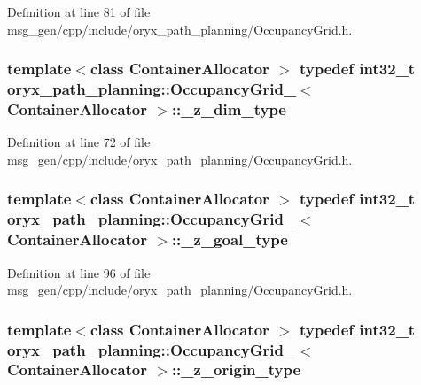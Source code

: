 \-Definition at line 81 of file msg\-\_\-gen/cpp/include/oryx\-\_\-path\-\_\-planning/\-Occupancy\-Grid.\-h.

\subsubsection[{\-\_\-z\-\_\-dim\-\_\-type}]{\setlength{\rightskip}{0pt plus 5cm}template$<$class Container\-Allocator $>$ typedef int32\-\_\-t {\bf oryx\-\_\-path\-\_\-planning\-::\-Occupancy\-Grid\-\_\-}$<$ \-Container\-Allocator $>$\-::{\bf \-\_\-z\-\_\-dim\-\_\-type}}\label{structoryx__path__planning_1_1OccupancyGrid___a92236f6c892e983f1aad904d75ca487d}


\-Definition at line 72 of file msg\-\_\-gen/cpp/include/oryx\-\_\-path\-\_\-planning/\-Occupancy\-Grid.\-h.

\subsubsection[{\-\_\-z\-\_\-goal\-\_\-type}]{\setlength{\rightskip}{0pt plus 5cm}template$<$class Container\-Allocator $>$ typedef int32\-\_\-t {\bf oryx\-\_\-path\-\_\-planning\-::\-Occupancy\-Grid\-\_\-}$<$ \-Container\-Allocator $>$\-::{\bf \-\_\-z\-\_\-goal\-\_\-type}}\label{structoryx__path__planning_1_1OccupancyGrid___a437f260847280c93fdda788afd2300f5}


\-Definition at line 96 of file msg\-\_\-gen/cpp/include/oryx\-\_\-path\-\_\-planning/\-Occupancy\-Grid.\-h.

\subsubsection[{\-\_\-z\-\_\-origin\-\_\-type}]{\setlength{\rightskip}{0pt plus 5cm}template$<$class Container\-Allocator $>$ typedef int32\-\_\-t {\bf oryx\-\_\-path\-\_\-planning\-::\-Occupancy\-Grid\-\_\-}$<$ \-Container\-Allocator $>$\-::{\bf \-\_\-z\-\_\-origin\-\_\-type}}\label{structoryx__path__planning_1_1OccupancyGrid___ae0c4c5c1d7a76925af77d13aa6042498}


